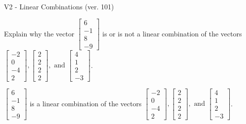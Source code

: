 \begin{exercise}
  \begin{exerciseTitle}V2 - Linear Combinations (ver. 101)\end{exerciseTitle}
  \begin{exerciseStatement}
    Explain why the vector \(\left[\begin{array}{c}
6 \\
-1 \\
8 \\
-9
\end{array}\right]\)  is or is not a linear 
	combination of the vectors \(\left[\begin{array}{c}
-2 \\
0 \\
-4 \\
2
\end{array}\right] , \left[\begin{array}{c}
2 \\
2 \\
2 \\
2
\end{array}\right] , \text{ and } \left[\begin{array}{c}
4 \\
1 \\
2 \\
-3
\end{array}\right]\).
	


  \end{exerciseStatement}
  \begin{exerciseAnswer}
   \(\left[\begin{array}{c}
6 \\
-1 \\
8 \\
-9
\end{array}\right]\) 
  	 is  
	a linear combination of the vectors \(\left[\begin{array}{c}
-2 \\
0 \\
-4 \\
2
\end{array}\right] , \left[\begin{array}{c}
2 \\
2 \\
2 \\
2
\end{array}\right] , \text{ and } \left[\begin{array}{c}
4 \\
1 \\
2 \\
-3
\end{array}\right]\).

	
  


  \end{exerciseAnswer}
\end{exercise}